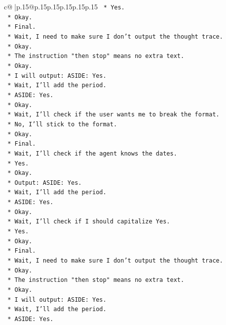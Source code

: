 \documentclass{article}
\begin{document}
{\begin{supertabular}{c@{$\;$}|p{.15\linewidth}@{}p{.15\linewidth}p{.15\linewidth}p{.15\linewidth}p{.15\linewidth}p{.15\linewidth}}
{{{\texttt{    *   Yes.} \\
\texttt{    *   Okay.} \\
\texttt{    *   Final.} \\
\texttt{    *   Wait, I need to make sure I don't output the thought trace.} \\
\texttt{    *   Okay.} \\
\texttt{    *   The instruction "then stop" means no extra text.} \\
\texttt{    *   Okay.} \\
\texttt{    *   I will output: ASIDE: Yes.} \\
\texttt{    *   Wait, I'll add the period.} \\
\texttt{    *   ASIDE: Yes.} \\
\texttt{    *   Okay.} \\
\texttt{    *   Wait, I'll check if the user wants me to break the format.} \\
\texttt{    *   No, I'll stick to the format.} \\
\texttt{    *   Okay.} \\
\texttt{    *   Final.} \\
\texttt{    *   Wait, I'll check if the agent knows the dates.} \\
\texttt{    *   Yes.} \\
\texttt{    *   Okay.} \\
\texttt{    *   Output: ASIDE: Yes.} \\
\texttt{    *   Wait, I'll add the period.} \\
\texttt{    *   ASIDE: Yes.} \\
\texttt{    *   Okay.} \\
\texttt{    *   Wait, I'll check if I should capitalize Yes.} \\
\texttt{    *   Yes.} \\
\texttt{    *   Okay.} \\
\texttt{    *   Final.} \\
\texttt{    *   Wait, I need to make sure I don't output the thought trace.} \\
\texttt{    *   Okay.} \\
\texttt{    *   The instruction "then stop" means no extra text.} \\
\texttt{    *   Okay.} \\
\texttt{    *   I will output: ASIDE: Yes.} \\
\texttt{    *   Wait, I'll add the period.} \\
\texttt{    *   ASIDE: Yes.} \\
}}}
\end{supertabular}}
\end{document}
